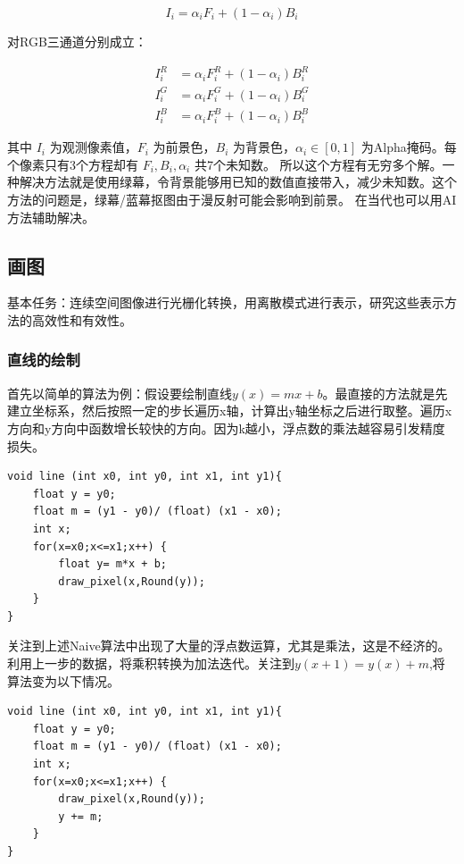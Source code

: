 \[
I_i = \alpha_i F_i + (1 - \alpha_i) B_i
\]

对RGB三通道分别成立：

\[
\begin{aligned}
I_i^{R} &= \alpha_i F_i^{R} + (1 - \alpha_i) B_i^{R} \\
I_i^{G} &= \alpha_i F_i^{G} + (1 - \alpha_i) B_i^{G} \\
I_i^{B} &= \alpha_i F_i^{B} + (1 - \alpha_i) B_i^{B}
\end{aligned}
\]

其中 $I_i$ 为观测像素值，$F_i$ 为前景色，$B_i$ 为背景色，$\alpha_i \in [0,1]$ 为Alpha掩码。每个像素只有3个方程却有 $F_i, B_i, \alpha_i$ 共7个未知数。
所以这个方程有无穷多个解。一种解决方法就是使用绿幕，令背景能够用已知的数值直接带入，减少未知数。这个方法的问题是，绿幕/蓝幕抠图由于漫反射可能会影响到前景。
在当代也可以用AI方法辅助解决。


\subsection{画图}

基本任务：连续空间图像进行光栅化转换，用离散模式进行表示，研究这些表示方法的高效性和有效性。

\subsubsection{直线的绘制}
首先以简单的算法为例：假设要绘制直线$y(x) = m x + b$。最直接的方法就是先建立坐标系，然后按照一定的步长遍历x轴，计算出y轴坐标之后进行取整。遍历x方向和y方向中函数增长较快的方向。因为k越小，浮点数的乘法越容易引发精度损失。

\begin{lstlisting}[style=MyCppStyle]
void line (int x0, int y0, int x1, int y1){
    float y = y0;
    float m = (y1 - y0)/ (float) (x1 - x0);
    int x;
    for(x=x0;x<=x1;x++) {
        float y= m*x + b;
        draw_pixel(x,Round(y));
    }
}
\end{lstlisting}

关注到上述Naive算法中出现了大量的浮点数运算，尤其是乘法，这是不经济的。利用上一步的数据，将乘积转换为加法迭代。关注到$y(x + 1) = y(x) + m$,将算法变为以下情况。

\begin{lstlisting}[style=MyCppStyle]
void line (int x0, int y0, int x1, int y1){
    float y = y0;
    float m = (y1 - y0)/ (float) (x1 - x0);
    int x;
    for(x=x0;x<=x1;x++) {
        draw_pixel(x,Round(y));
        y += m;
    }
}
\end{lstlisting}

